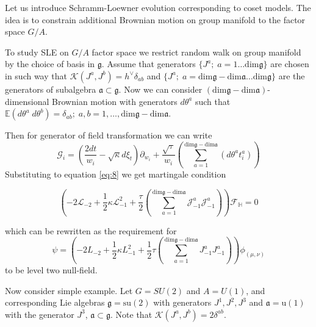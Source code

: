 \documentclass[a4paper]{jpconf}
\theoremstyle{definition}
\newcommand{\gf}{\mathfrak{g}}
\newcommand{\af}{\mathfrak{a}}
\theoremstyle{definition} \newtheorem{Def}{Definition}
\begin{document}
Let us introduce Schramm-Loewner evolution corresponding to coset models. 
The idea is to constrain additional Brownian motion on group manifold to the factor space $G/A$. 


To study SLE on $G/A$ factor space we restrict random walk on group manifold by the choice of basis in $\gf$. Assume that generators $\{J^{a};\; a=1\dots \mathrm{dim}\gf\}$ are chosen in such way that $\mathcal{K}(J^{a},J^{b})=h^{\vee}\delta_{ab}$ and $\{J^{a};\; a=\mathrm{dim}\gf-\mathrm{dim}\af\dots \mathrm{dim}\gf\}$ are the generators of subalgebra $\af\subset \gf$. Now we can consider $(\mathrm{dim}\gf-\mathrm{dim}\af)$-dimensional Brownian motion with generators $d\theta^{a}$ such that $\mathbb{E}(d\theta^{a} \; d\theta^{b})=\delta_{ab};\; a,b=1,\dots,\mathrm{dim}\gf-\mathrm{dim}\af$.

Then for generator of field transformation we can write 
\begin{equation}
  \mathcal{G}_{i}=\left(\frac{2dt}{w_{i}}-\sqrt{\kappa} d\xi_{t}\right) \partial_{w_{i}}+\frac{\sqrt{\tau}}{w_{i}}\left(\sum_{a=1}^{\mathrm{dim}\gf-\mathrm{dim}\af}\left(d \theta ^{a} t^{a}_{i}\right)\right)
\label{eq:5}
\end{equation}
Substituting to equation \eqref{eq:8} we get martingale condition

\begin{equation}
  \left(-2 \mathcal{L}_{-2}+\frac{1}{2}\kappa \mathcal{L}_{-1}^{2}+\frac{\tau}{2}\left( \sum_{a=1}^{\mathrm{dim}\gf-\mathrm{dim}\af} \mathcal{J}^{a}_{-1} \mathcal{J}^{a}_{-1}\right)\right)        \mathcal{F}_{\mathbb{H}}=0
\label{eq:9}
\end{equation}

which can be rewritten as the requirement for
\begin{equation}
  \psi=\left(-2L_{-2}+\frac{1}{2}\kappa L_{-1}^{2}+\frac{1}{2}\tau \left(\sum_{a=1}^{\mathrm{dim}\gf-\mathrm{dim}\af}J^{a}_{-1}J^{a}_{-1}\right)\right) \phi_{(\mu,\nu)}
\label{eq:10}
\end{equation}
to be level two null-field. 

Now consider simple example. Let $G=SU(2)$ and $A=U(1)$, and corresponding Lie algebras $\gf=\mathrm{su}(2)$
with generators $J^{1},J^{2},J^{3}$ and $\af=\mathrm{u}(1)$ with the generator $J^{3}$, $\af\subset\gf$. Note that $\mathcal{K}(J^{a},J^{b})=2\delta^{ab}$. 
\end{document}
